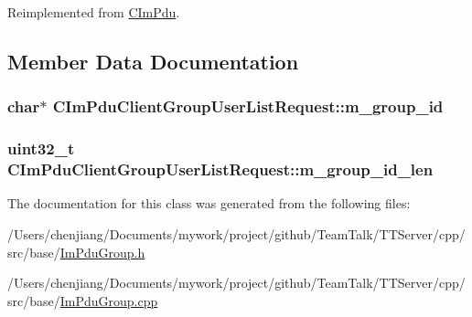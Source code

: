 Reimplemented from \hyperlink{class_c_im_pdu_a887912f445b3e864d33f9e7f2325f1fc}{C\+Im\+Pdu}.



\subsection{Member Data Documentation}
\hypertarget{class_c_im_pdu_client_group_user_list_request_a20d577661515f35195c6aeb8afa56179}{}
\subsubsection[{m\+\_\+group\+\_\+id}]{\setlength{\rightskip}{0pt plus 5cm}char$\ast$ C\+Im\+Pdu\+Client\+Group\+User\+List\+Request\+::m\+\_\+group\+\_\+id\hspace{0.3cm}{\ttfamily [private]}}\label{class_c_im_pdu_client_group_user_list_request_a20d577661515f35195c6aeb8afa56179}
\hypertarget{class_c_im_pdu_client_group_user_list_request_a348158d0861ef07c089878bdd64c7645}{}
\subsubsection[{m\+\_\+group\+\_\+id\+\_\+len}]{\setlength{\rightskip}{0pt plus 5cm}uint32\+\_\+t C\+Im\+Pdu\+Client\+Group\+User\+List\+Request\+::m\+\_\+group\+\_\+id\+\_\+len\hspace{0.3cm}{\ttfamily [private]}}\label{class_c_im_pdu_client_group_user_list_request_a348158d0861ef07c089878bdd64c7645}


The documentation for this class was generated from the following files\+:\begin{DoxyCompactItemize}
\item 
/\+Users/chenjiang/\+Documents/mywork/project/github/\+Team\+Talk/\+T\+T\+Server/cpp/src/base/\hyperlink{_im_pdu_group_8h}{Im\+Pdu\+Group.\+h}\item 
/\+Users/chenjiang/\+Documents/mywork/project/github/\+Team\+Talk/\+T\+T\+Server/cpp/src/base/\hyperlink{_im_pdu_group_8cpp}{Im\+Pdu\+Group.\+cpp}\end{DoxyCompactItemize}

